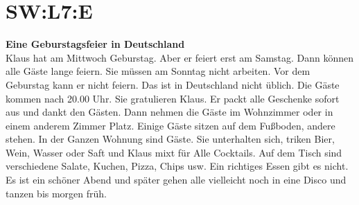 \section{SW:L7:E}
\noindent
\textbf{Eine Geburstagsfeier in Deutschland}  \\
Klaus hat am Mittwoch Geburstag. Aber er feiert erst am Samstag. 
Dann können alle Gäste lange feiern. 
Sie müssen am Sonntag nicht arbeiten. Vor dem Geburstag kann er nicht feiern. 
Das ist in Deutschland nicht üblich. 
Die Gäste kommen nach 20.00 Uhr. Sie gratulieren Klaus.
Er packt alle Geschenke sofort aus und dankt den Gästen.
Dann nehmen die Gäste im Wohnzimmer oder in einem anderem Zimmer Platz. 
Einige Gäste sitzen auf dem Fußboden, andere stehen. 
In der Ganzen Wohnung sind Gäste. 
Sie unterhalten sich, triken Bier, Wein, Wasser oder Saft und Klaus mixt für Alle Cocktails. 
Auf dem Tisch sind verschiedene Salate, Kuchen, Pizza, Chips usw. 
Ein richtiges Essen gibt es nicht. 
Es ist ein schöner Abend und später gehen alle vielleicht noch in eine Disco und tanzen bis morgen früh.

